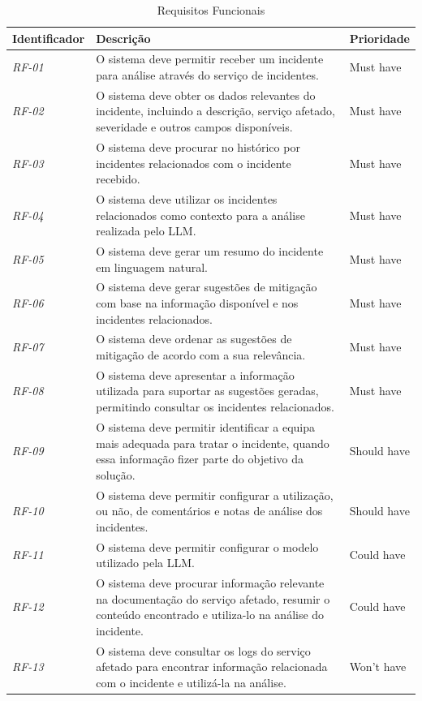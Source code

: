 		\begin{table}[H]
			\centering
			\begin{tabular}{p{2.1cm}p{9cm}p{2cm}}
				\hline
				\textbf{Identificador} & \textbf{Descrição} & \textbf{Prioridade} \\
				\hline
				\textit{RF-01} & O sistema deve permitir receber um incidente para análise através do serviço de incidentes. & Must have \\
				\hline
				\textit{RF-02} & O sistema deve obter os dados relevantes do incidente, incluindo a descrição, serviço afetado, severidade e outros campos disponíveis. & Must have \\
				\hline
				\textit{RF-03} & O sistema deve procurar no histórico por incidentes relacionados com o incidente recebido. & Must have \\
				\hline
				\textit{RF-04} & O sistema deve utilizar os incidentes relacionados como contexto para a análise realizada pelo \gls{LLM}. & Must have \\
				\hline
				\textit{RF-05} & O sistema deve gerar um resumo do incidente em linguagem natural. & Must have \\
				\hline
				\textit{RF-06} & O sistema deve gerar sugestões de mitigação com base na informação disponível e nos incidentes relacionados. & Must have \\
				\hline
				\textit{RF-07} & O sistema deve ordenar as sugestões de mitigação de acordo com a sua relevância. & Must have \\
				\hline
				\textit{RF-08} & O sistema deve apresentar a informação utilizada para suportar as sugestões geradas, permitindo consultar os incidentes relacionados. & Must have \\
				\hline
				\textit{RF-09} & O sistema deve permitir identificar a equipa mais adequada para tratar o incidente, quando essa informação fizer parte do objetivo da solução. & Should have \\
				\hline
				\textit{RF-10} & O sistema deve permitir configurar a utilização, ou não, de comentários e notas de análise dos incidentes. & Should have \\
				\hline
				\textit{RF-11} & O sistema deve permitir configurar o modelo utilizado pela \gls{LLM}. & Could have \\
				\hline
				\textit{RF-12} & O sistema deve procurar informação relevante na documentação do serviço afetado, resumir o conteúdo encontrado e utiliza-lo na análise do incidente. & Could have \\
				\hline
				\textit{RF-13} & O sistema deve consultar os logs do serviço afetado para encontrar informação relacionada com o incidente e utilizá-la na análise. & Won't have \\
				\hline
			\end{tabular}
			\caption[Requisitos Funcionais]{Requisitos Funcionais}
			\label{tab:requisitos_funcionais}
		\end{table}
	
